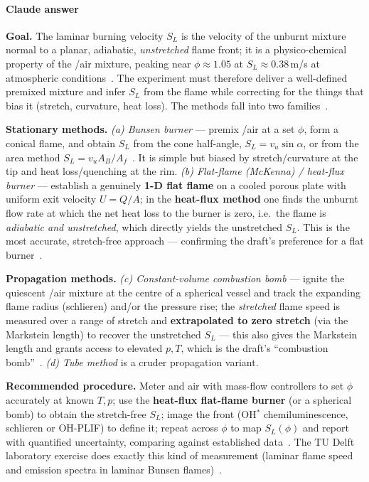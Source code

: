 {\color{istblue}
\paragraph{Claude answer}
\textbf{Goal.} The laminar burning velocity $S_L$ is the velocity of the unburnt mixture normal to a planar, adiabatic, \emph{unstretched} flame front; it is a physico-chemical property of the /air mixture, peaking near $\phi \approx 1.05$ at $S_L \approx 0.38$\,m/s at atmospheric conditions~\cite{lecture5,warnatz2006combustion}. The experiment must therefore deliver a well-defined premixed mixture and infer $S_L$ from the flame while correcting for the things that bias it (stretch, curvature, heat loss). The methods fall into two families~\cite{lecture5,mishra2014experimental}.

\textbf{Stationary methods.} \emph{(a) Bunsen burner} --- premix /air at a set $\phi$, form a conical flame, and obtain $S_L$ from the cone half-angle, $S_L = v_u \sin\alpha$, or from the area method $S_L = v_u A_B/A_f$~\cite{lecture5,halpern1958measurement}. It is simple but biased by stretch/curvature at the tip and heat loss/quenching at the rim. \emph{(b) Flat-flame (McKenna) / heat-flux burner} --- establish a genuinely \textbf{1-D flat flame} on a cooled porous plate with uniform exit velocity $U = Q/A$; in the \textbf{heat-flux method} one finds the unburnt flow rate at which the net heat loss to the burner is zero, i.e.\ the flame is \emph{adiabatic and unstretched}, which directly yields the unstretched $S_L$. This is the most accurate, stretch-free approach --- confirming the draft's preference for a flat burner~\cite{lecture5,warnatz2006combustion}.

\textbf{Propagation methods.} \emph{(c) Constant-volume combustion bomb} --- ignite the quiescent /air mixture at the centre of a spherical vessel and track the expanding flame radius (schlieren) and/or the pressure rise; the \emph{stretched} flame speed is measured over a range of stretch and \textbf{extrapolated to zero stretch} (via the Markstein length) to recover the unstretched $S_L$ --- this also gives the Markstein length and grants access to elevated $p,T$, which is the draft's ``combustion bomb''~\cite{lecture5,mishra2014experimental}. \emph{(d) Tube method} is a cruder propagation variant.

\textbf{Recommended procedure.} Meter  and air with mass-flow controllers to set $\phi$ accurately at known $T,p$; use the \textbf{heat-flux flat-flame burner} (or a spherical bomb) to obtain the stretch-free $S_L$; image the front (OH$^*$ chemiluminescence, schlieren or OH-PLIF) to define it; repeat across $\phi$ to map $S_L(\phi)$ and report with quantified uncertainty, comparing against established  data~\cite{dirrenberger2011methane_Ch4_flame_speed,warnatz2006combustion}. The TU Delft laboratory exercise does exactly this kind of measurement (laminar flame speed and emission spectra in laminar Bunsen flames)~\cite{AE4262_LabExercise2026}.
}



